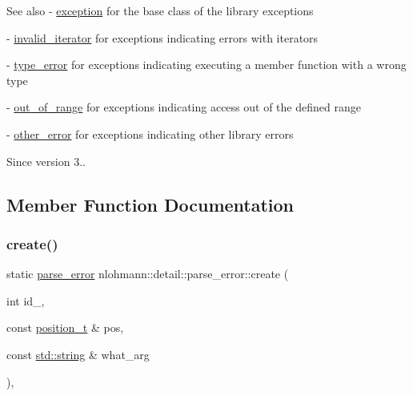 \begin{DoxySeeAlso}{See also}
-\/ \hyperlink{classnlohmann_1_1detail_1_1exception}{exception} for the base class of the library exceptions 

-\/ \hyperlink{classnlohmann_1_1detail_1_1invalid__iterator}{invalid\+\_\+iterator} for exceptions indicating errors with iterators 

-\/ \hyperlink{classnlohmann_1_1detail_1_1type__error}{type\+\_\+error} for exceptions indicating executing a member function with a wrong type 

-\/ \hyperlink{classnlohmann_1_1detail_1_1out__of__range}{out\+\_\+of\+\_\+range} for exceptions indicating access out of the defined range 

-\/ \hyperlink{classnlohmann_1_1detail_1_1other__error}{other\+\_\+error} for exceptions indicating other library errors
\end{DoxySeeAlso}
\begin{DoxySince}{Since}
version 3.. 
\end{DoxySince}


\subsection{Member Function Documentation}
\mbox{\label{classnlohmann_1_1detail_1_1parse__error_a137ea4d27de45d8a844fd13451d40f3d}} 
\subsubsection{\texorpdfstring{create()}{create()}}
{\footnotesize\ttfamily static \hyperlink{classnlohmann_1_1detail_1_1parse__error}{parse\+\_\+error} nlohmann\+::detail\+::parse\+\_\+error\+::create (\begin{DoxyParamCaption}\item[{int}]{id\+\_\+,  }\item[{const \hyperlink{structnlohmann_1_1detail_1_1position__t}{position\+\_\+t} \&}]{pos,  }\item[{const \hyperlink{namespacenlohmann_1_1detail_a1ed8fc6239da25abcaf681d30ace4985ab45cffe084dd3d20d928bee85e7b0f21}{std\+::string} \&}]{what\+\_\+arg }\end{DoxyParamCaption})\hspace{0.3cm}{\ttfamily [inline]}, {\ttfamily [static]}}




